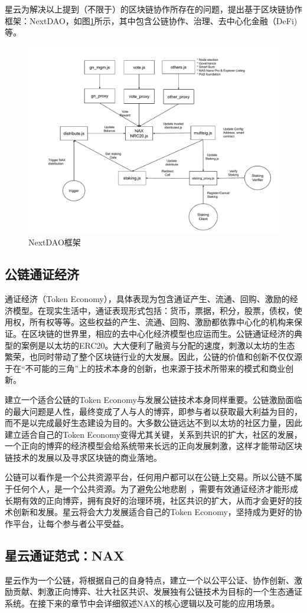 星云为解决以上提到（不限于）的区块链协作所存在的问题，提出基于区块链协作框架：NextDAO，如图\ref{fig:nextdao}所示，其中包含公链协作、治理、去中心化金融（DeFi)等。
\begin{figure}[htbp]
  \centering
    \includegraphics[width=1\textwidth]{../common/nax.pdf}
    \caption{NextDAO框架 \label{fig:nextdao}}
\end{figure}

\subsection{公链通证经济}
通证经济（Token Economy），具体表现为包含通证产生、流通、回购、激励的经济模型。在现实生活中，通证表现形式包括：货币，票据，积分，股票，债权，使用权，所有权等等。这些权益的产生、流通、回购、激励都依靠中心化的机构来保证。在区块链的世界里，相应的去中心化经济模型也应运而生。公链通证经济的典型的案例是以太坊的ERC20。大大便利了融资与分配的速度，刺激以太坊的生态繁荣，也同时带动了整个区块链行业的大发展。因此，公链的价值和创新不仅仅源于在“不可能的三角”上的技术本身的创新，也来源于技术所带来的模式和商业创新。

建立一个适合公链的Token Economy与发展公链技术本身同样重要。公链激励面临的最大问题是人性，最终变成了人与人的博弈，即参与者以获取最大利益为目的，而不是以完成最好生态建设为目的。大多数公链远达不到以太坊的社区力量，因此建立适合自己的Token Economy变得尤其关键，关系到共识的扩大，社区的发展，一个正向的博弈的经济模型会给系统带来长远的正向发展刺激，这样才能带动区块链技术的发展以及寻求区块链的商业落地。

公链可以看作是一个公共资源平台，任何用户都可以在公链上交易。所以公链不属于任何个人，是一个公共资源。为了避免公地悲剧~\cite{TragedyOfTheCommons}，需要有效通证经济才能形成长期有效的正向博弈，拥有良好的治理环境，社区共识的扩大，从而才会更好的技术创新和发展。星云将会大力发展适合自己的Token Economy，坚持成为更好的协作平台，让每个参与者公平受益。

\subsection{星云通证范式：NAX}
星云作为一个公链，将根据自己的自身特点，建立一个以公平公证、协作创新、激励贡献、刺激正向博弈、壮大社区共识、发展独有公链技术为目标的一个生态通证系统。在接下来的章节中会详细叙述NAX的核心逻辑以及可能的应用场景。

